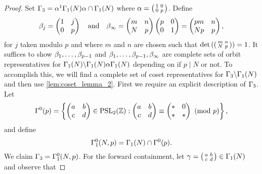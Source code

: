     \begin{proof}
      Set $\Gamma_{3} = \alpha^{1}\Gamma_{1}(N)\alpha \cap \Gamma_{1}(N)$ where $\alpha = \begin{psmallmatrix} 1 & 0 \\ 0 & p \end{psmallmatrix}$. Define
      \[
        \beta_{j} = \begin{pmatrix} 1 & j \\ 0 & p \end{pmatrix} \quad \text{and} \quad \beta_{\infty} = \begin{pmatrix} m & n \\ N & p \end{pmatrix}\begin{pmatrix} p & 0 \\ 0 & 1 \end{pmatrix} = \begin{pmatrix} pm & n \\ Np & p \end{pmatrix},
      \]
      for $j$ taken modulo $p$ and where $m$ and $n$ are chosen such that $\det\left(\begin{psmallmatrix} m & n \\ N & p \end{psmallmatrix}\right) = 1$. It suffices to show $\beta_{1},\ldots,\beta_{p-1}$ and $\beta_{1},\ldots,\beta_{p-1},\beta_{\infty}$ are complete sets of orbit representatives for $\Gamma_{1}(N)\backslash\Gamma_{1}(N)\alpha\Gamma_{1}(N)$ depending on if $p \mid N$ or not. To accomplish this, we will find a complete set of coset representatives for $\Gamma_{3}\backslash\Gamma_{1}(N)$ and then use \cref{lem:coset_lemma_2}. First we require an explicit description of $\Gamma_{3}$. Let
      \[
        \Gamma^{0}(p) = \left\{\begin{pmatrix} a & b \\ c & d \end{pmatrix} \in \mathrm{PSL}_{2}(\mathbb{Z}):\begin{pmatrix} a & b \\ c & d \end{pmatrix} \equiv \begin{pmatrix} \ast & 0 \\ \ast & \ast \end{pmatrix} \ \left(\text{mod }p\right)\right\},
      \]
      and define
      \[
        \Gamma_{1}^{0}(N,p) = \Gamma_{1}(N) \cap \Gamma^{0}(p).
      \]
      We claim $\Gamma_{3} = \Gamma_{1}^{0}(N,p)$. For the forward containment, let $\gamma = \begin{psmallmatrix} a & b \\ c & d \end{psmallmatrix} \in \Gamma_{1}(N)$ and observe that

\end{proof}

